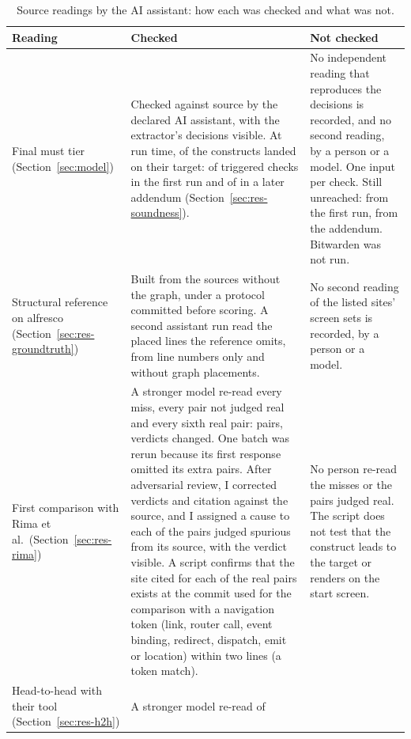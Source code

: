 \begin{table}[!htbp]\small
\caption{Source readings by the AI assistant: how each was checked and what was not.}
\label{tab:ai-readings}
\begin{tabularx}{\textwidth}{@{}>{\raggedright\arraybackslash}p{}YY@{}}
\toprule
Reading & Checked & Not checked \\
\midrule
Final must tier (Section~\ref{sec:model}) & Checked against source by the declared AI assistant, with the extractor's decisions visible. At run time, \MustRunConfirmedConstructs{} of the \CensusMustSites{} constructs landed on their target: \MustRunAllConfirmed{} of \MustRunAllTriggered{} triggered checks in the first run and \MustRunAddAllConfirmed{} of \MustRunAddAllTriggered{} in a later addendum (Section~\ref{sec:res-soundness}). & No independent reading that reproduces the decisions is recorded, and no second reading, by a person or a model. One input per check. Still unreached: \MustRunMifosUnreached{} from the first run, \MustRunAddAllUnreached{} from the addendum. Bitwarden was not run. \\
\addlinespace
Structural reference on alfresco (Section~\ref{sec:res-groundtruth}) & Built from the sources
without the graph, under a protocol committed before scoring. A second assistant run read the
placed lines the reference omits, from line numbers only and without graph placements. & No second
reading of the \GTAlfSites{} listed sites' screen sets is recorded, by a person or a model. \\
\addlinespace
First comparison with Rima et al.\ (Section~\ref{sec:res-rima}) & A stronger model re-read every
miss, every pair not judged real and every sixth real pair: \RimaGated{} pairs, \RimaGateChanged{}
verdicts changed. One batch was rerun because its first response omitted its extra pairs. After
adversarial review, I corrected \RimaCorrected{} verdicts and \RimaRecited{} citation against the
source, and I assigned a cause to each of the \RimaJudgedSpurious{} pairs judged spurious from its
source, with the verdict visible. A script confirms that the site cited for each of the \RimaJudgedReal{} real pairs exists
at the commit used for the comparison with a navigation token (link, router call, event binding, redirect, dispatch, emit or location) within two lines (a token match). &
No person re-read the misses or the pairs judged real. The script does not test that the construct leads to the target
or renders on the start screen. \\
\addlinespace
Head-to-head with their tool (Section~\ref{sec:res-h2h}) & A stronger model re-read \HHGated{} of

\end{tabularx}
\end{table}

